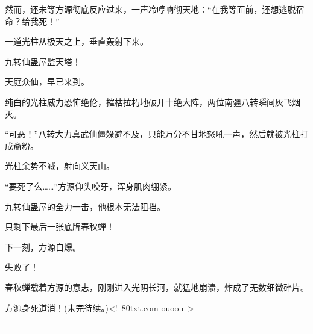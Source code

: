 \begin{this_body}
然而，还未等方源彻底反应过来，一声冷哼响彻天地：“在我等面前，还想逃脱宿命？给我死！”

一道光柱从极天之上，垂直轰射下来。

九转仙蛊屋监天塔！

天庭众仙，早已来到。

纯白的光柱威力恐怖绝伦，摧枯拉朽地破开十绝大阵，两位南疆八转瞬间灰飞烟灭。

“可恶！”八转大力真武仙僵躲避不及，只能万分不甘地怒吼一声，然后就被光柱打成齑粉。

光柱余势不减，射向义天山。

“要死了么……”方源仰头咬牙，浑身肌肉绷紧。

九转仙蛊屋的全力一击，他根本无法阻挡。

只剩下最后一张底牌春秋蝉！

下一刻，方源自爆。

失败了！

春秋蝉载着方源的意志，刚刚进入光阴长河，就猛地崩溃，炸成了无数细微碎片。

方源身死道消！(未完待续。)<!--80txt.com-ouoou-->

------------

\end{this_body}

